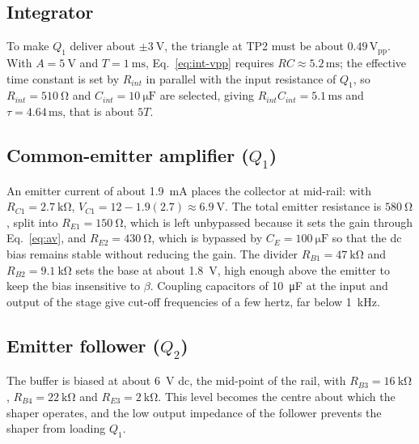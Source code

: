 \documentclass[12pt,a4paper]{article}
\begin{document}
	\subsection{Integrator}
	To make $Q_1$ deliver about $\pm\SI{3}{\volt}$, the triangle at TP2 must be about $0.49\,\mathrm{V_{pp}}$. With $A=\SI{5}{\volt}$ and $T=\SI{1}{\milli\second}$, Eq.~\eqref{eq:int-vpp} requires $RC\approx5.2\,\mathrm{ms}$; the effective time constant is set by $R_{int}$ in parallel with the input resistance of $Q_1$, so $R_{int}=\SI{510}{\ohm}$ and $C_{int}=\SI{10}{\micro\farad}$ are selected, giving $R_{int}C_{int}=5.1\,\mathrm{ms}$ and $\tau=4.64\,\mathrm{ms}$, that is about $5T$.

	\subsection{Common-emitter amplifier ($Q_1$)}
	An emitter current of about \SI{1.9}{\milli\ampere} places the collector at mid-rail: with $R_{C1}=\SI{2.7}{\kilo\ohm}$, $V_{C1}=12-1.9(2.7)\approx\SI{6.9}{\volt}$. The total emitter resistance is $\SI{580}{\ohm}$, split into $R_{E1}=\SI{150}{\ohm}$, which is left unbypassed because it sets the gain through Eq.~\eqref{eq:av}, and $R_{E2}=\SI{430}{\ohm}$, which is bypassed by $C_E=\SI{100}{\micro\farad}$ so that the dc bias remains stable without reducing the gain. The divider $R_{B1}=\SI{47}{\kilo\ohm}$ and $R_{B2}=\SI{9.1}{\kilo\ohm}$ sets the base at about \SI{1.8}{\volt}, high enough above the emitter to keep the bias insensitive to $\beta$. Coupling capacitors of \SI{10}{\micro\farad} at the input and output of the stage give cut-off frequencies of a few hertz, far below \SI{1}{\kilo\hertz}.

	\subsection{Emitter follower ($Q_2$)}
	The buffer is biased at about \SI{6}{\volt} dc, the mid-point of the rail, with $R_{B3}=\SI{16}{\kilo\ohm}$, $R_{B4}=\SI{22}{\kilo\ohm}$ and $R_{E3}=\SI{2}{\kilo\ohm}$. This level becomes the centre about which the shaper operates, and the low output impedance of the follower prevents the shaper from loading $Q_1$.
\end{document}
